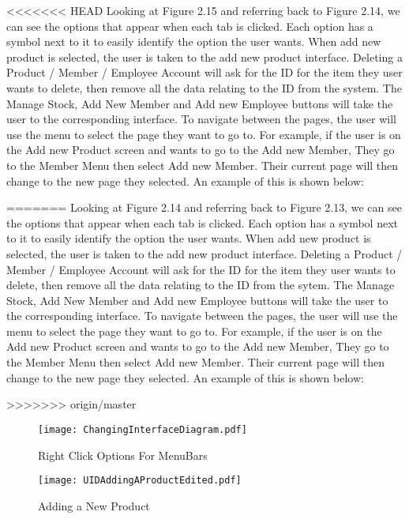 <<<<<<< HEAD
Looking at Figure 2.15 and referring back to Figure 2.14, we can see the options that appear when each tab is clicked. Each option has a symbol next to it to easily identify the option the user wants. When add new product is selected, the user is taken to the add new product interface. Deleting a Product / Member / Employee Account will ask for the ID for the item they user wants to delete, then remove all the data relating to the ID from the system. The Manage Stock, Add New Member and Add new Employee buttons will take the user to the corresponding interface. To navigate between the pages, the user will use the menu to select the page they want to go to. For example, if the user is on the Add new Product screen and wants to go to the Add new Member, They go to the Member Menu then select Add new Member. Their current page will then change to the new page they selected. An example of this is shown below:\par
=======
Looking at Figure 2.14 and referring back to Figure 2.13, we can see the options that appear when each tab is clicked. Each option has a symbol next to it to easily identify the option the user wants. When add new product is selected, the user is taken to the add new product interface. Deleting a Product / Member / Employee Account will ask for the ID for the item they user wants to delete, then remove all the data relating to the ID from the sytem. The Manage Stock, Add New Member and Add new Employee buttons will take the user to the corresponding interface. To navigate between the pages, the user will use the menu to select the page they want to go to. For example, if the user is on the Add new Product screen and wants to go to the Add new Member, They go to the Member Menu then select Add new Member. Their current page will then change to the new page they selected. An example of this is shown below:\par
>>>>>>> origin/master

\begin{figure}[H]
\caption{Right Click Options For MenuBars} \label{fig:Right Click Options For MenuBars}
\hfill\texttt{[image: ChangingInterfaceDiagram.pdf]}\hspace*{\fill}
\end{figure}

\pagebreak

\begin{figure}[H]
\caption{Adding a New Product} \label{fig:Adding a New Product Interface}
\hfill\texttt{[image: UIDAddingAProductEdited.pdf]}\hspace*{\fill}
\end{figure}

